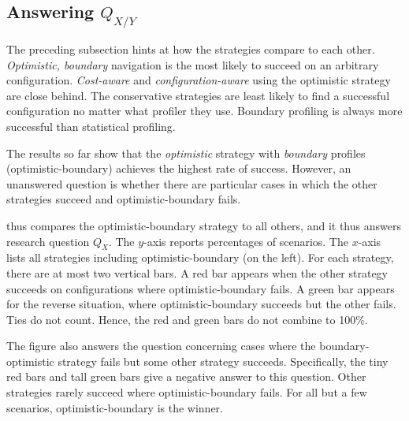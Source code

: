 \subsection{Answering $Q_{X/Y}$} \label{subsec:hh} \label{s:hh}

The preceding subsection hints at how the strategies compare to each other.
\emph{Optimistic, boundary} navigation is the most likely to succeed on an
arbitrary configuration.  \emph{Cost-aware} and \emph{configuration-aware} using
the optimistic strategy are close behind.  The conservative strategies are least
likely to find a successful configuration no matter what profiler they use.
Boundary profiling is always more successful than statistical profiling.

The results so far show that the \emph{optimistic} strategy with \emph{boundary}
profiles (optimistic-boundary) achieves the highest rate of success.  However,
an unanswered question is whether there are particular cases in which the other
strategies succeed and optimistic-boundary fails.

 thus compares the optimistic-boundary strategy to all
others, and it thus answers research question $Q_X$.  The $y$-axis reports
percentages of scenarios.  The $x$-axis lists all strategies including
optimistic-boundary (on the left).  For each strategy, there are at most two
vertical bars.  A red bar appears when the other strategy succeeds on
configurations where optimistic-boundary fails.  A green bar appears for the
reverse situation, where optimistic-boundary succeeds but the other fails.  Ties
do not count.  Hence, the red and green bars do not combine to 100\%.

The figure also answers the question concerning cases where the
boundary-optimistic strategy fails but some other strategy succeeds.
Specifically, the tiny red bars and tall green bars give a negative answer to
this question.  Other strategies rarely succeed where optimistic-boundary fails.
For all but a few scenarios, optimistic-boundary is the winner.
